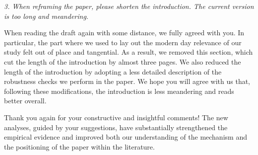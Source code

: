 \noindent \textit{\textcolor{red!60!black}{
3. When reframing the paper, please shorten the introduction. The current version is too long and meandering.
}}
 \bigskip

\noindent When reading the draft again with some distance, we fully agreed with you. In particular, the part where we used to lay out the modern day relevance of our study felt out of place and tangential. As a result, we removed this section, which cut the length of the introduction by almost three pages. We also reduced the length of the introduction by adopting a less detailed description of the robustness checks we perform in the paper. We hope you will agree with us that, following these modifications, the introduction is less meandering and reads better overall.

Thank you again for your constructive and insightful comments! The new analyses, guided by your suggestions, have substantially strengthened the empirical evidence and improved both our understanding of the mechanism and the positioning of the paper within the literature.
